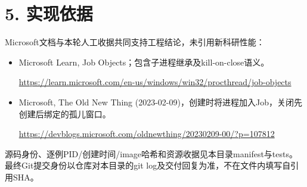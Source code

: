\documentclass[UTF8,a4paper,11pt]{ctexart}
\begin{document}
\section*{5. 实现依据}
Microsoft文档与本轮人工收据共同支持工程结论，未引用新科研性能：
\begin{itemize}
\item Microsoft Learn, Job Objects；包含子进程继承及kill-on-close语义。
\par{\footnotesize\url{https://learn.microsoft.com/en-us/windows/win32/procthread/job-objects}}\par
\item Microsoft, The Old New Thing (2023-02-09)，创建时将进程加入Job，关闭先创建后绑定的孤儿窗口。
\par{\footnotesize\url{https://devblogs.microsoft.com/oldnewthing/20230209-00/?p=107812}}\par
\end{itemize}
源码身份、逐例PID/创建时间/image哈希和资源收据见本目录manifest与tests。最终Git提交身份以仓库对本目录的git log及交付回复为准，不在文件内填写自引用SHA。
\end{document}
